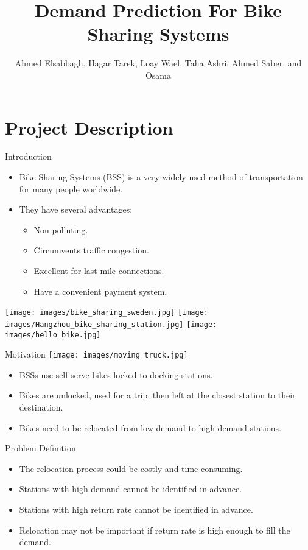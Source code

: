 \documentclass[
  ignorenonframetext,
]{beamer}
\title{Demand Prediction For Bike Sharing Systems}
\author{Ahmed Elsabbagh, Hagar Tarek, Loay Wael, Taha Ashri, Ahmed
Saber, and Osama}
\date{}
\providecommand{\tightlist}{%
  \setlength{\itemsep}{0pt}\setlength{\parskip}{0pt}}
\begin{document}
\frame{\titlepage}

\hypertarget{project-description}{%
\section{Project Description}\label{project-description}}

\begin{frame}{Introduction}
\protect\hypertarget{introduction}{}
\begin{itemize}
\item
  Bike Sharing Systems (BSS) is a very widely used method of
  transportation for many people worldwide.
\item
  They have several advantages:

  \begin{itemize}
  \tightlist
  \item
    Non-polluting.
  \item
    Circumvents traffic congestion.
  \item
    Excellent for last-mile connections.
  \item
    Have a convenient payment system.
  \end{itemize}
\end{itemize}

\texttt{[image: images/bike\_sharing\_sweden.jpg]}
\texttt{[image: images/Hangzhou\_bike\_sharing\_station.jpg]}
\texttt{[image: images/hello\_bike.jpg]}
\end{frame}

\begin{frame}{Motivation}
\protect\hypertarget{motivation}{}
\texttt{[image: images/moving\_truck.jpg]}

\begin{itemize}
\tightlist
\item
  BSSs use self-serve bikes locked to docking stations.
\item
  Bikes are unlocked, used for a trip, then left at the closest station
  to their destination.
\item
  Bikes need to be relocated from low demand to high demand stations.
\end{itemize}
\end{frame}

\begin{frame}{Problem Definition}
\protect\hypertarget{problem-definition}{}
\begin{itemize}
\tightlist
\item
  The relocation process could be costly and time consuming.
\item
  Stations with high demand cannot be identified in advance.
\item
  Stations with high return rate cannot be identified in advance.
\item
  Relocation may not be important if return rate is high enough to fill
  the demand.
\end{itemize}
\end{frame}
\end{document}
